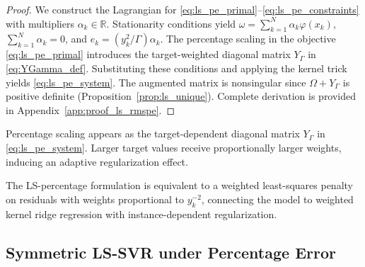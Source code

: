 \documentclass[mathematics,article,submit,pdftex,moreauthors]{Definitions/mdpi}
\begin{document}
\begin{proof}
We construct the Lagrangian for \eqref{eq:ls_pe_primal}--\eqref{eq:ls_pe_constraints} 
with multipliers $\alpha_k \in \mathbb{R}$. Stationarity conditions yield 
$\omega = \sum_{k=1}^N \alpha_k\varphi(x_k)$, $\sum_{k=1}^N \alpha_k = 0$, 
and $e_k = (y_k^2/\Gamma)\alpha_k$. The percentage scaling in the objective \eqref{eq:ls_pe_primal} 
introduces the target-weighted diagonal matrix $Y_\Gamma$ in \eqref{eq:YGamma_def}. 
Substituting these conditions and applying the kernel trick yields \eqref{eq:ls_pe_system}. 
The augmented matrix is nonsingular since $\Omega + Y_\Gamma$ is positive definite 
(Proposition~\ref{prop:ls_unique}). 
Complete derivation is provided in Appendix~\ref{app:proof_ls_rmspe}.
\end{proof}

\begin{Remark}\label{rem:ls_percent_effect}
Percentage scaling appears as the target-dependent diagonal matrix $Y_\Gamma$ in \eqref{eq:ls_pe_system}. 
Larger target values receive proportionally larger weights, inducing an adaptive regularization effect.
\end{Remark}

\begin{Remark}\label{rem:ls_weighted_view}
The LS-percentage formulation is equivalent to a weighted least-squares penalty on residuals with weights proportional to $y_k^{-2}$, 
connecting the model to weighted kernel ridge regression with instance-dependent regularization.~\cite{Scholkopf2002}
\end{Remark}


\subsection{Symmetric LS-SVR under Percentage Error}\label{subsec:ls_sym_pe}
\end{document}
